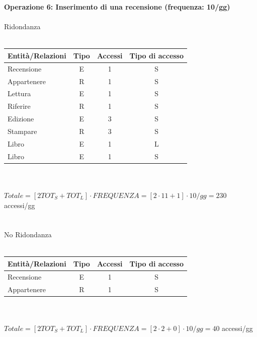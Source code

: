 \documentclass{article}
\begin{document}
\vspace{1cm} %
\noindent
\textbf{Operazione 6: Inserimento di una recensione (frequenza: 10/gg)}
\\\\
Ridondanza
\\\\
\begin{tabular}{|l|c|c|c|}
	\hline
	\textbf{Entità/Relazioni} & \textbf{Tipo} & \textbf{Accessi} & \textbf{Tipo di accesso} \\
	\hline
	Recensione                & E             & 1                & S                        \\
	Appartenere               & R             & 1                & S                        \\
	Lettura                   & E             & 1                & S                        \\
	Riferire                  & R             & 1                & S                        \\
	Edizione                  & E             & 3                & S                        \\
	Stampare                  & R             & 3                & S                        \\
	Libro                     & E             & 1                & L                        \\
	Libro                     & E             & 1                & S                        \\
	\hline
\end{tabular}
\\\\
$Totale = [2TOT_S + TOT_L] \cdot FREQUENZA =  [2\cdot 11+ 1] \cdot 10/gg = 230$ accessi/gg
\\\\\\No Ridondanza
\\\\\begin{tabular}{|l|c|c|c|}
	\hline
	\textbf{Entità/Relazioni} & \textbf{Tipo} & \textbf{Accessi} & \textbf{Tipo di accesso} \\
	\hline
	Recensione                & E             & 1                & S                        \\
	Appartenere               & R             & 1                & S                        \\
	\hline
\end{tabular}
\\\\
$Totale = [2TOT_S + TOT_L] \cdot FREQUENZA =  [2\cdot 2 + 0] \cdot 10/gg = 40$ accessi/gg
\end{document}
